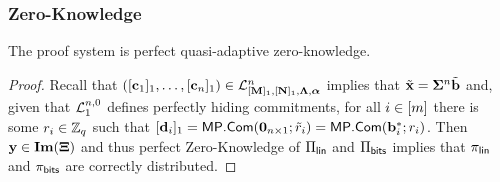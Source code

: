 \subsubsection{Zero-Knowledge}

\begin{theorem}
The proof system is perfect quasi-adaptive zero-knowledge.
\end{theorem}

\begin{proof}
Recall that $([\mathbf{c}_1]_1,\ldots,[\mathbf{c}_n]_1)\in\mathcal{L}^n_{[\mathbf{{M}}]_1,[\mathbf{{N}}]_1,\mathbf{{\Lambda}},{\boldsymbol \alpha}}$ implies that
$
{\tilde{\mathbf{x}}}
=\mathbf{{\Sigma}}^n{\tilde{\mathbf{b}}}
$
and, given that $\mathcal{L}_1^{n,0}$ defines perfectly hiding commitments, for all $i\in[{m}]$ there is some $r_i\in\mathbb{Z}_q$ such that
$[\mathbf{d}_i]_1=\mathsf{MP}.\mathsf{Com}(\mathbf{{0}}_{n\times1};\tilde{{r}}_i)=\mathsf{MP}.\mathsf{Com}(\mathbf{b}_i^*;r_i)$. Then $\mathbf{y}\in\mathbf{Im}(\mathbf{{\Xi}})$ and thus perfect Zero-Knowledge of $\Pi_{\mathsf{lin}}$ and $\Pi_{\mathsf{bits}}$ implies that $\pi_{\mathsf{lin}}$ and $\pi_{\mathsf{bits}}$ are correctly distributed.
\end{proof}
